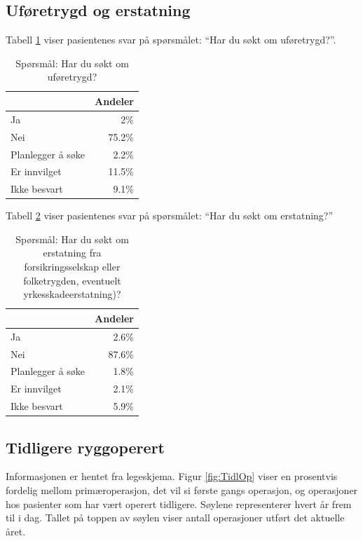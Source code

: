 \documentclass [norsk,a4paper,twoside]{article}\usepackage[]{graphicx}\usepackage[]{color}
\begin{document}
\clearpage


\subsection{Uføretrygd og erstatning }

Tabell \ref{tab:Ufor} viser pasientenes svar på spørsmålet: ``Har du søkt om uføretrygd?''.

\begin{table}[ht]
\centering
\begin{tabular}{lr}
  \hline
 & Andeler \\ 
  \hline
Ja & 2\% \\ 
  Nei & 75.2\% \\ 
  Planlegger å søke & 2.2\% \\ 
  Er innvilget & 11.5\% \\ 
  Ikke besvart & 9.1\% \\ 
   \hline
\end{tabular}
\caption{Spørsmål: Har du søkt om uføretrygd?} 
\label{tab:Ufor}
\end{table}



Tabell \ref{tab:Erst} viser pasientenes svar på spørsmålet: ``Har du søkt om erstatning?'' 

\begin{table}[ht]
\centering
\begin{tabular}{lr}
  \hline
 & Andeler \\ 
  \hline
Ja & 2.6\% \\ 
  Nei & 87.6\% \\ 
  Planlegger å søke & 1.8\% \\ 
  Er innvilget & 2.1\% \\ 
  Ikke besvart & 5.9\% \\ 
   \hline
\end{tabular}
\caption{Spørsmål: Har du søkt om erstatning fra forsikringsselskap eller folketrygden, 
		eventuelt yrkesskadeerstatning)?} 
\label{tab:Erst}
\end{table}



\subsection{Tidligere ryggoperert}
Informasjonen er hentet fra legeskjema.
Figur \ref{fig:TidlOp} viser en prosentvis fordelig mellom primæroperasjon, det vil si første gangs 
operasjon, og operasjoner hos pasienter som har vært operert tidligere.  
Søylene representerer hvert år frem til i dag. Tallet på toppen av søylen viser antall operasjoner utført 
det aktuelle året.
\end{document}
